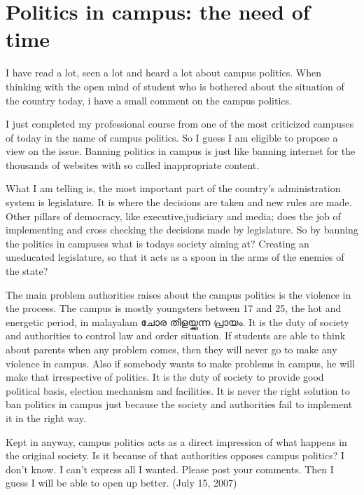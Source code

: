 \section*{Politics in campus: the need of time}
\vskip 2pt
I have read a lot, seen a lot and heard a lot about campus politics. 
When thinking with the open mind of student who is bothered about 
the situation of the country today, i have a small comment on the campus politics.

I just completed my professional course from one of the most criticized campuses of 
today in the name of campus politics. So I guess I am eligible to propose a view on the issue. 
Banning politics in campus is just like banning internet for the thousands of websites with 
so called inappropriate content.


What I am telling is, the most important part of the country’s administration system is legislature. 
It is where the decisions are taken and new rules are made. Other pillars of democracy, 
like executive,judiciary and media; does the job of implementing and cross checking the decisions 
made by legislature. So by banning the politics in campuses what is todays society aiming at? Creating an 
uneducated legislature, so that it acts as a spoon in the arms of the enemies of the state?


The main problem authorities raises about the campus politics is the violence in the process. The campus
is mostly youngsters between 17 and 25, the hot and energetic period, in malayalam ചോര തിളയ്ക്കുന്ന പ്രായം. 
It is the duty of society and authorities to control law and order situation. If students are able to think about
parents when any problem comes, then they will never go to make any violence in campus. Also if somebody wants 
to make problems in campus, he will make that irrespective of politics. It is the duty of society to provide good
political basis, election mechanism and facilities. It is never the right solution to ban politics in campus just 
because the society and authorities fail to implement it in the right way. 


Kept in anyway, campus politics acts as a direct impression of what happens in the original society. 
Is it because of that authorities opposes campus politics? I don’t know. I can’t express all I wanted. 
Please post your comments. Then I guess I will be able to open up better. 
(July 15, 2007)
\newpage
